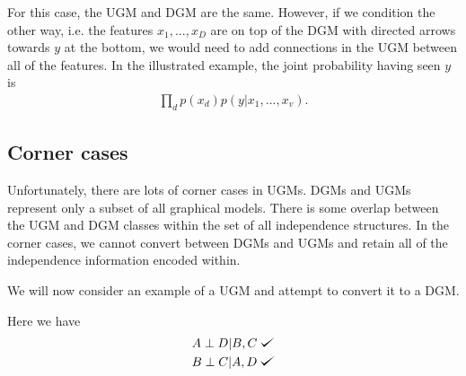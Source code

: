 \documentclass{article}
\def\checkmark{\tikz\fill[scale=0.4](0,.35) -- (.25,0) -- (1,.7) -- (.25,.15) -- cycle;}
\begin{document}
For this case, the UGM and DGM are the same. However, if we condition the other way, i.e. the features $x_1, ..., x_D$ are on top of the DGM with directed arrows towards $y$ at the bottom, we would need to add connections in the UGM between all of the features. In the illustrated example, the joint probability having seen $y$ is
\begin{align}
\prod_d p(x_d) p(y|x_1,...,x_v).
\end{align}

\subsection{Corner cases}

Unfortunately, there are lots of corner cases in UGMs. DGMs and UGMs represent only a subset of all graphical models. There is some overlap between the UGM and DGM classes within the set of all independence structures. In the corner cases, we cannot convert between DGMs and UGMs and retain all of the independence information encoded within.

\begin{center}
\end{center}
\smallskip

We will now consider an example of a UGM and attempt to convert it to a DGM.
\begin{center}
\end{center}
Here we have
\begin{align}
A \perp D|B,C \; \checkmark\\
B \perp C|A,D \; \checkmark\\
\end{align}
\end{document}
